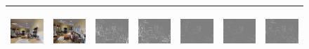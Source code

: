 \documentclass[letterpaper, 10 pt, conference]{ieeeconf}  %
\begin{document}
\begin{figure}[h!]
\begin{center}
\begin{tabular}{|c| c |c | c | c | c | c|}
 \\ \hline
\includegraphics[width=18mm, height=17mm]{TrueDepth/STOKES/init.png} &   
            \includegraphics[width=18mm, height=17mm]{TrueDepth/STOKES/des.png} & 
           \includegraphics[width=18mm, height=17mm]{PhotoVS/STOKES/ferror.png} & 
           \includegraphics[width=18mm, height=17mm]{ICRA17/STOKES/ferror.png} & 
 \includegraphics[width=18mm, height=17mm]{TrueDepth/STOKES/ferror.png} &
 \includegraphics[width=18mm, height=17mm]{DepthNetwork/STOKES/ferror.png}  &
 \includegraphics[width=18mm, height=17mm]{FlowDepth/STOKES/ferror.png}  \\ \hline

\hline \hline


\end{tabular}
\end{center}
\end{figure}
\end{document}

